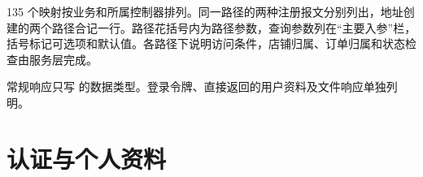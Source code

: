 135 个映射按业务和所属控制器排列。同一路径的两种注册报文分别列出，地址创建的两个路径合记一行。路径花括号内为路径参数，查询参数列在“主要入参”栏，括号标记可选项和默认值。各路径下说明访问条件，店铺归属、订单归属和状态检查由服务层完成。

常规响应只写  的数据类型。登录令牌、直接返回的用户资料及文件响应单独列明。

\begingroup
\setlength{\tabcolsep}{3pt}
\makeatletter
\def\Url@space{\penalty\Url@sppen\ }%
\makeatother
\renewcommand{\code}[1]{{%
  \fontsize{9.5bp}{13.8bp}\selectfont
  \def\UrlBreaks{\do\/\do\.\do\_\do\,}%
  \def\UrlBigBreaks{\do\<\do\-}%
  \def\UrlNoBreaks{\do\(\do\[\do\{}%
  \nolinkurl{#1}%
}}

\Needspace{.19\textheight}
\section{认证与个人资料}

